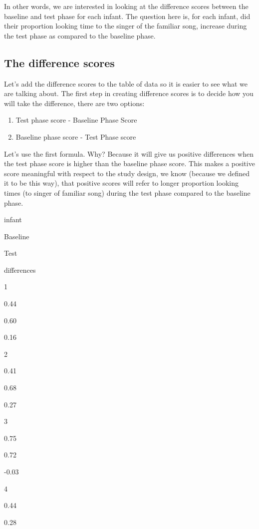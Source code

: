 \documentclass[]{book}
\providecommand{\tightlist}{%
  \setlength{\itemsep}{0pt}\setlength{\parskip}{0pt}}
\begin{document}
In other words, we are interested in looking at the difference scores between the baseline and test phase for each infant. The question here is, for each infant, did their proportion looking time to the singer of the familiar song, increase during the test phase as compared to the baseline phase.

\hypertarget{the-difference-scores}{%
\subsection{The difference scores}\label{the-difference-scores}}

Let's add the difference scores to the table of data so it is easier to see what we are talking about. The first step in creating difference scores is to decide how you will take the difference, there are two options:

\begin{enumerate}
\def\labelenumi{\arabic{enumi}.}
\tightlist
\item
  Test phase score - Baseline Phase Score
\item
  Baseline phase score - Test Phase score
\end{enumerate}

Let's use the first formula. Why? Because it will give us positive differences when the test phase score is higher than the baseline phase score. This makes a positive score meaningful with respect to the study design, we know (because we defined it to be this way), that positive scores will refer to longer proportion looking times (to singer of familiar song) during the test phase compared to the baseline phase.

infant

Baseline

Test

differences

1

0.44

0.60

0.16

2

0.41

0.68

0.27

3

0.75

0.72

-0.03

4

0.44

0.28
\end{document}
